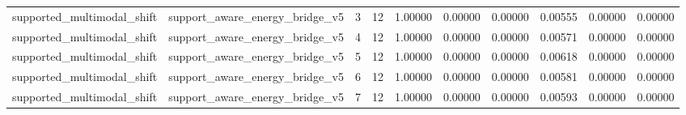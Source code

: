 \documentclass{article}
\begin{document}
\begin{table}[tbp]
{\begin{tabular}{llllllllll}
supported\_multimodal\_shift & support\_aware\_energy\_bridge\_v5 & 3 & 12 & 1.00000 & 0.00000 & 0.00000 & 0.00555 & 0.00000 & 0.00000 \\
supported\_multimodal\_shift & support\_aware\_energy\_bridge\_v5 & 4 & 12 & 1.00000 & 0.00000 & 0.00000 & 0.00571 & 0.00000 & 0.00000 \\
supported\_multimodal\_shift & support\_aware\_energy\_bridge\_v5 & 5 & 12 & 1.00000 & 0.00000 & 0.00000 & 0.00618 & 0.00000 & 0.00000 \\
supported\_multimodal\_shift & support\_aware\_energy\_bridge\_v5 & 6 & 12 & 1.00000 & 0.00000 & 0.00000 & 0.00581 & 0.00000 & 0.00000 \\
supported\_multimodal\_shift & support\_aware\_energy\_bridge\_v5 & 7 & 12 & 1.00000 & 0.00000 & 0.00000 & 0.00593 & 0.00000 & 0.00000 \\
\bottomrule
\end{tabular}
}
\end{table}

\clearpage
\end{document}
